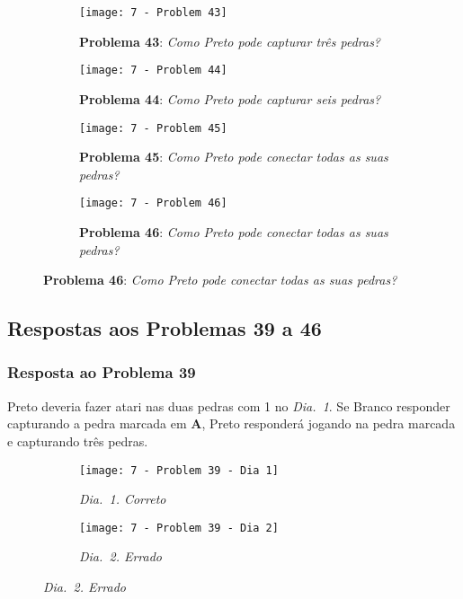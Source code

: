 \begin{figure}[h!]
    \centering
    \begin{subfigure}[t]{.35\textwidth}
        \texttt{[image: 7 - Problem 43]}
        \caption*{\textbf{Problema 43}: \emph{Como Preto pode capturar três pedras?}}
    \end{subfigure}
    \hspace{1.5cm}
    \begin{subfigure}[t]{.35\textwidth}
        \texttt{[image: 7 - Problem 44]}
        \caption*{\textbf{Problema 44}: \emph{Como Preto pode capturar seis pedras?}}
    \end{subfigure}
    \par\bigskip
    \begin{subfigure}[t]{.35\textwidth}
        \texttt{[image: 7 - Problem 45]}
        \caption*{\textbf{Problema 45}: \emph{Como Preto pode conectar todas as suas pedras?}}
    \end{subfigure}
    \hspace{1.5cm}
    \begin{subfigure}[t]{.35\textwidth}
        \texttt{[image: 7 - Problem 46]}
        \caption*{\textbf{Problema 46}: \emph{Como Preto pode conectar todas as suas pedras?}}
    \end{subfigure}
\end{figure}

\pagebreak

\subsection{Respostas aos Problemas 39 a 46}

\subsubsection*{Resposta ao Problema 39}

Preto deveria fazer atari nas duas pedras com 1 no \emph{Dia.\@~1}. Se Branco responder capturando a pedra marcada em \textbf{A}, Preto responderá jogando na pedra marcada e capturando três pedras.
    
\begin{figure}[h!]
    \centering
    \begin{subfigure}[t]{.425\textwidth}
        \texttt{[image: 7 - Problem 39 - Dia 1]}
        \captionsetup{justification=centering}
        \caption*{\emph{Dia.\@~1. Correto}}
    \end{subfigure}
    \hspace{1cm}
    \begin{subfigure}[t]{.425\textwidth}
        \texttt{[image: 7 - Problem 39 - Dia 2]}
        \captionsetup{justification=centering}
        \caption*{\emph{Dia.\@~2. Errado}}
    \end{subfigure}
\end{figure}

